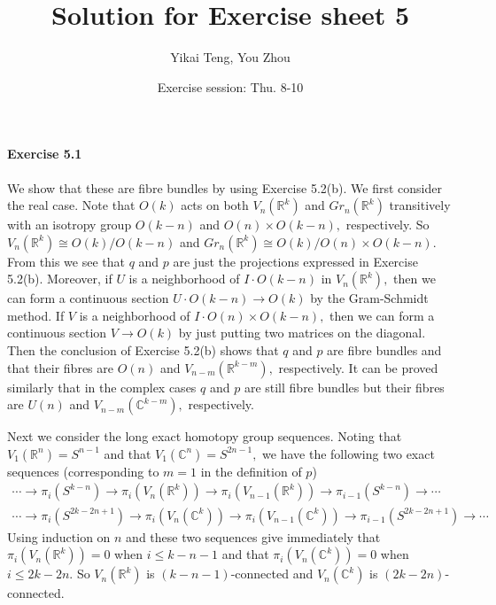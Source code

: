 \documentclass{article}
\title{Solution for Exercise sheet 5}
\author{Yikai Teng, You Zhou}
\date{Exercise session: Thu. 8-10}
\begin{document}
\maketitle

\paragraph{Exercise 5.1}
We show that these are fibre bundles by using Exercise 5.2(b). We first consider the real case. Note that $O(k)$ acts on both $V_n(\mathbb{R}^k)$ and $Gr_n(\mathbb{R}^k)$ transitively with an isotropy group $O(k-n)$ and $O(n)\times O(k-n),$ respectively. So $V_n(\mathbb{R}^k)\cong O(k)/O(k-n)$ and $Gr_n(\mathbb{R}^k)\cong O(k)/O(n)\times O(k-n).$ From this we see that $q$ and $p$ are just the projections expressed in Exercise 5.2(b). Moreover, if $U$ is a neighborhood of $I\cdot O(k-n)$ in $V_n(\mathbb{R}^k),$ then we can form a continuous section $U\cdot O(k-n)\rightarrow O(k)$ by the Gram-Schmidt method. If $V$ is a neighborhood of $I\cdot O(n)\times O(k-n),$ then we can form a continuous section $V\rightarrow O(k)$ by just putting two matrices on the diagonal. Then the conclusion of Exercise 5.2(b) shows that $q$ and $p$ are fibre bundles and that their fibres are $O(n)$ and $V_{n-m}(\mathbb{R}^{k-m}),$ respectively. It can be proved similarly that in the complex cases $q$ and $p$ are still fibre bundles but their fibres are $U(n)$ and $V_{n-m}(\mathbb{C}^{k-m}),$ respectively.

Next we consider the long exact homotopy group sequences. Noting that $V_1(\mathbb{R}^{n})=S^{n-1}$ and that $V_1(\mathbb{C}^{n})=S^{2n-1},$ we have the following two exact sequences (corresponding to $m=1$ in the definition of $p$)
\begin{gather}
\cdots\rightarrow \pi_i(S^{k-n})\rightarrow \pi_i(V_n(\mathbb{R}^k))\rightarrow \pi_i(V_{n-1}(\mathbb{R}^k))\rightarrow \pi_{i-1}(S^{k-n})\rightarrow\cdots \label{les1}\\
\cdots\rightarrow \pi_i(S^{2k-2n+1})\rightarrow \pi_i(V_n(\mathbb{C}^k))\rightarrow \pi_i(V_{n-1}(\mathbb{C}^k))\rightarrow \pi_{i-1}(S^{2k-2n+1})\rightarrow\cdots \label{les2}
\end{gather}
Using induction on $n$ and these two sequences give immediately that $\pi_i(V_n(\mathbb{R}^k))=0$ when $i\leq k-n-1$ and that $\pi_i(V_n(\mathbb{C}^k))=0$ when $i\leq 2k-2n.$ So $V_n(\mathbb{R}^k)$ is $(k-n-1)$-connected and $V_n(\mathbb{C}^k)$ is $(2k-2n)$-connected.
\end{document}
